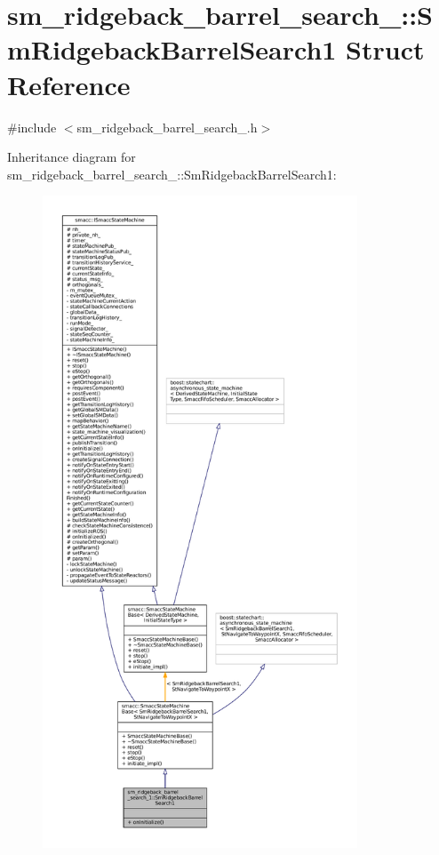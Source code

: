 \hypertarget{structsm__ridgeback__barrel__search__1_1_1SmRidgebackBarrelSearch1}{}\section{sm\+\_\+ridgeback\+\_\+barrel\+\_\+search\+\_\+:\+:Sm\+Ridgeback\+Barrel\+Search1 Struct Reference}
\label{structsm__ridgeback__barrel__search__1_1_1SmRidgebackBarrelSearch1}


{\ttfamily \#include $<$sm\+\_\+ridgeback\+\_\+barrel\+\_\+search\+\_.\+h$>$}



Inheritance diagram for sm\+\_\+ridgeback\+\_\+barrel\+\_\+search\+\_\+:\+:Sm\+Ridgeback\+Barrel\+Search1\+:
\nopagebreak
\begin{figure}[H]
\begin{center}
\leavevmode
\includegraphics[height=550pt]{structsm__ridgeback__barrel__search__1_1_1SmRidgebackBarrelSearch1__inherit__graph}
\end{center}
\end{figure}


